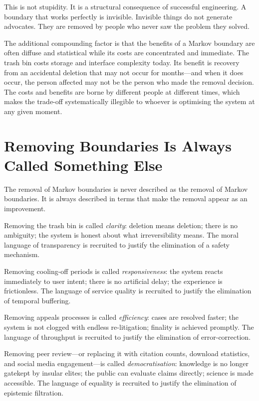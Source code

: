 \documentclass[12pt, a4paper]{article}
\begin{document}
This is not stupidity. It is a structural consequence of successful
engineering. A boundary that works perfectly is invisible. Invisible
things do not generate advocates. They are removed by people who never
saw the problem they solved.

The additional compounding factor is that the benefits of a Markov
boundary are often diffuse and statistical while its costs are
concentrated and immediate. The trash bin costs storage and interface
complexity today. Its benefit is recovery from an accidental deletion
that may not occur for months---and when it does occur, the person
affected may not be the person who made the removal decision. The
costs and benefits are borne by different people at different times,
which makes the trade-off systematically illegible to whoever is
optimising the system at any given moment.

\section{Removing Boundaries Is Always Called Something Else}

The removal of Markov boundaries is never described as the removal of
Markov boundaries. It is always described in terms that make the
removal appear as an improvement.

Removing the trash bin is called \emph{clarity}: deletion means
deletion; there is no ambiguity; the system is honest about what
irreversibility means. The moral language of transparency is
recruited to justify the elimination of a safety mechanism.

Removing cooling-off periods is called \emph{responsiveness}: the
system reacts immediately to user intent; there is no artificial
delay; the experience is frictionless. The language of service quality
is recruited to justify the elimination of temporal buffering.

Removing appeals processes is called \emph{efficiency}: cases are
resolved faster; the system is not clogged with endless re-litigation;
finality is achieved promptly. The language of throughput is recruited
to justify the elimination of error-correction.

Removing peer review---or replacing it with citation counts, download
statistics, and social media engagement---is called
\emph{democratisation}: knowledge is no longer gatekept by insular
elites; the public can evaluate claims directly; science is made
accessible. The language of equality is recruited to justify the
elimination of epistemic filtration.
\end{document}

